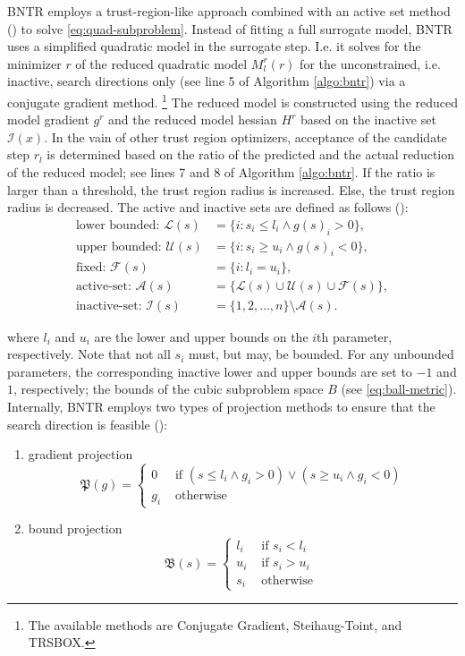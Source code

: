 BNTR employs a trust-region-like approach combined with an active set method (\cite{TAO21}) to solve \ref{eq:quad-subproblem}.
Instead of fitting a full surrogate model, BNTR uses a simplified quadratic model in the surrogate step. I.e. it solves for the minimizer $r$ of the reduced quadratic model $M^{r}_{l}(r)$ for the unconstrained, i.e. inactive, search directions only (see line 5 of Algorithm \ref{algo:bntr}) via a conjugate gradient method. \footnote{The available methods are Conjugate Gradient, Steihaug-Toint, and TRSBOX.}
The reduced model is constructed using the reduced model gradient $g^r$ and the reduced model hessian $H^r$ based on the inactive set $\mathcal{I}(x)$.
In the vain of other trust region optimizers, acceptance of the candidate step $r_l$ is determined based on the ratio of the predicted and the actual reduction of the reduced model; see lines 7 and 8 of Algorithm \ref{algo:bntr}. If the ratio is larger than a threshold, the trust region radius is increased. Else, the trust region radius is decreased.
The active and inactive sets are defined as follows (\cite{Bertsekas1982}):
\begin{align*}
\text{lower bounded: } \mathcal{L}(s) & = \{i: s_i \leq l_i \wedge g(s)_i > 0\}, \\
\text{upper bounded: } \mathcal{U}(s) & = \{i: s_i \geq u_i \wedge g(s)_i < 0\}, \\
\text{fixed: } \mathcal{F}(s) & = \{i: l_i = u_i\}, \\
\text{active-set: } \mathcal{A}(s) & = \{\mathcal{L}(s) \cup \mathcal{U}(s) \cup \mathcal{F}(s)\}, \\
\text{inactive-set: } \mathcal{I}(s) & = \{1,2,\ldots,n\} \setminus \mathcal{A}(s).
\end{align*}

\noindent where $l_i$ and $u_i$ are the lower and upper bounds on the $i$th parameter, respectively. Note that not all $s_i$ must, but may, be bounded. For any unbounded parameters, the corresponding inactive lower and upper bounds are set to $-1$ and $1$, respectively; the bounds of the cubic subproblem space $B$ (see \ref{eq:ball-metric}).
\noindent Internally, BNTR employs two types of projection methods to ensure that the search direction is feasible (\cite{TAO21}):

\begin{enumerate}
    \item gradient projection
    $$
    \mathfrak{P}(g)= \begin{cases}0 & \text { if }\left(s \leq l_i \wedge g_i>0\right) \vee\left(s \geq u_i \wedge g_i<0\right) \\ g_i & \text { otherwise }\end{cases}
    $$
    \item bound projection
    $$
    \mathfrak{B}(s)= \begin{cases}l_i & \text { if } s_i<l_i \\ u_i & \text { if } s_i>u_i \\ s_i & \text { otherwise }\end{cases}
    $$
\end{enumerate}


